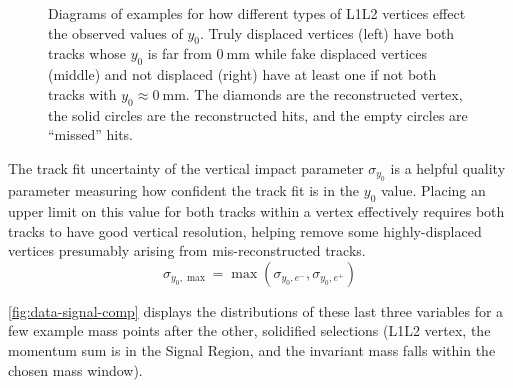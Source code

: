 \begin{figure}
  \begin{subfigure}{0.32\textwidth}
    \resizebox{\textwidth}{!}{}
  \end{subfigure}
  \begin{subfigure}{0.32\textwidth}
    \resizebox{\textwidth}{!}{}
  \end{subfigure}
  \begin{subfigure}{0.32\textwidth}
    \resizebox{\textwidth}{!}{}
  \end{subfigure}
  \caption{Diagrams of examples for how different types of L1L2 vertices effect the observed
  values of $y_0$.
  Truly displaced vertices (left) have both tracks whose $y_0$ is far
  from $\qty{0}{\mm}$ while fake displaced vertices (middle) and not displaced (right)
  have at least one if not both tracks with $y_0\approx\qty{0}{\mm}$.
  The diamonds are the reconstructed vertex, the solid circles are the reconstructed hits,
  and the empty circles are ``missed'' hits.}
  \label{fig:hps-displace-eg}
\end{figure}

The track fit uncertainty of the vertical impact parameter $\sigma_{y_0}$
is a helpful quality parameter measuring how confident the track fit is
in the $y_0$ value.
Placing an upper limit on this value for both tracks within a vertex
effectively requires both tracks to have good vertical resolution,
helping remove some highly-displaced vertices presumably arising
from mis-reconstructed tracks.
\begin{equation}
  \sigma_{y_0,\max} = \max(\sigma_{y_0,e^-},\sigma_{y_0,e^+})
\end{equation}

\cref{fig:data-signal-comp} displays the distributions of these last three
variables for a few example mass points after the other, solidified selections
(L1L2 vertex, the momentum sum is in the Signal Region, and the invariant mass
falls within the chosen mass window).


